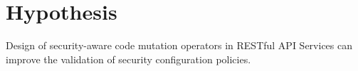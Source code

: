 \section{Hypothesis}

Design of security-aware code mutation operators in RESTful API Services can improve the validation of security configuration policies.
